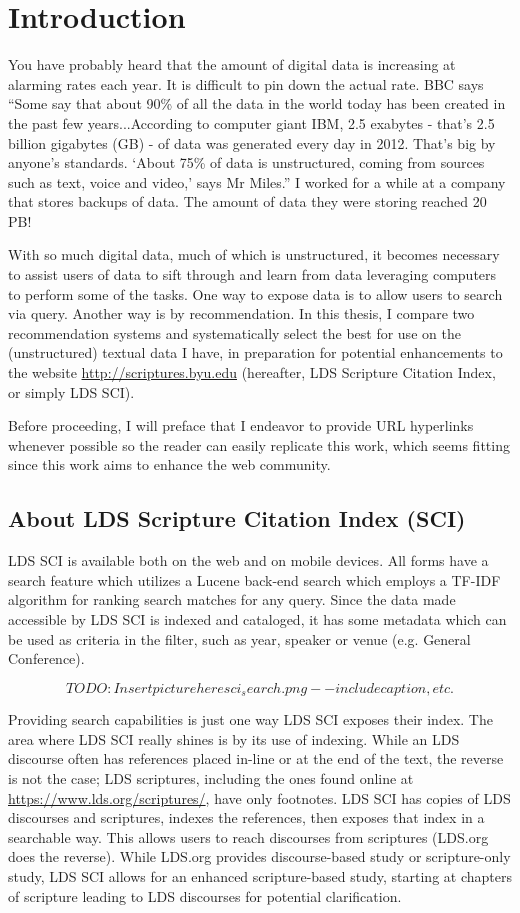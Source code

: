 \chapter{Introduction}
You have probably heard that the amount of digital data is increasing at alarming rates each year. It is difficult to pin down the actual rate. BBC says ``Some say that about 90\% of all the data in the world today has been created in the past few years...According to computer giant IBM, 2.5 exabytes - that's 2.5 billion gigabytes (GB) - of data was generated every day in 2012. That's big by anyone's standards. ‘About 75\% of data is unstructured, coming from sources such as text, voice and video,’ says Mr Miles.'' I worked for a while at a company that stores backups of data. The amount of data they were storing reached 20 PB!

With so much digital data, much of which is unstructured, it becomes necessary to assist users of data to sift through and learn from data leveraging computers to perform some of the tasks. One way to expose data is to allow users to search via query. Another way is by recommendation. In this thesis, I compare two recommendation systems and systematically select the best for use on the (unstructured) textual data I have, in preparation for potential enhancements to the website \url{http://scriptures.byu.edu} (hereafter, LDS Scripture Citation Index, or simply LDS SCI).

Before proceeding, I will preface that I endeavor to provide URL hyperlinks whenever possible so the reader can easily replicate this work, which seems fitting since this work aims to enhance the web community.

\section{About LDS Scripture Citation Index (SCI)}
LDS SCI is available both on the web and on mobile devices. All forms have a search feature which utilizes a Lucene \cite{lucene:luke} back-end search which employs a TF-IDF algorithm for ranking search matches for any query. Since the data made accessible by LDS SCI is indexed and cataloged, it has some metadata which can be used as criteria in the filter, such as year, speaker or venue (e.g. General Conference).

\[TODO: Insert picture here sci_search.png--include caption, etc.\]

Providing search capabilities is just one way LDS SCI exposes their index. The area where LDS SCI really shines is by its use of indexing. While an LDS discourse often has references placed in-line or at the end of the text, the reverse is not the case; LDS scriptures, including the ones found online at \url{https://www.lds.org/scriptures/}, have only footnotes. LDS SCI has copies of LDS discourses and scriptures, indexes the references, then exposes that index in a searchable way. This allows users to reach discourses from scriptures (LDS.org does the reverse). While LDS.org provides discourse-based study or scripture-only study, LDS SCI allows for an enhanced scripture-based study, starting at chapters of scripture leading to LDS discourses for potential clarification.

